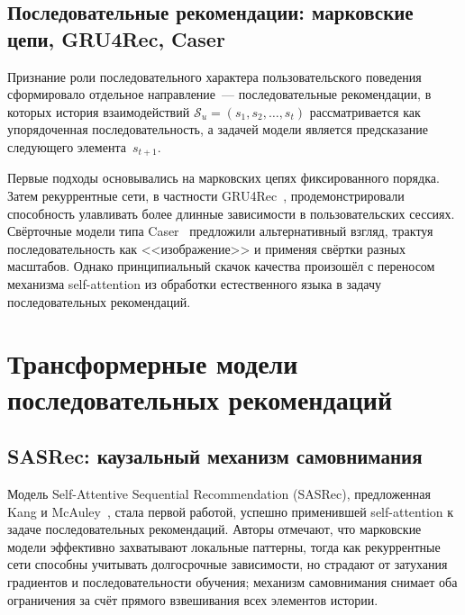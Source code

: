 \subsection{Последовательные рекомендации: марковские цепи, GRU4Rec, Caser}
\label{subsec:ch1:seq-pre-transformer}

Признание роли последовательного характера пользовательского поведения сформировало отдельное направление~--- последовательные рекомендации, в которых история взаимодействий $\mathcal{S}_u = (s_1, s_2, \ldots, s_t)$ рассматривается как упорядоченная последовательность, а задачей модели является предсказание следующего элемента~$s_{t+1}$.

Первые подходы основывались на марковских цепях фиксированного порядка. Затем рекуррентные сети, в частности GRU4Rec~\cite{hidasi2016session}, продемонстрировали способность улавливать более длинные зависимости в пользовательских сессиях. Свёрточные модели типа Caser~\cite{tang2018caser} предложили альтернативный взгляд, трактуя последовательность как <<изображение>> и применяя свёртки разных масштабов. Однако принципиальный скачок качества произошёл с переносом механизма self-attention из обработки естественного языка в задачу последовательных рекомендаций.

\section{Трансформерные модели последовательных рекомендаций}
\label{sec:ch1:transformers}

\subsection{SASRec: каузальный механизм самовнимания}
\label{subsec:ch1:sasrec}

Модель Self-Attentive Sequential Recommendation (SASRec), предложенная Kang и McAuley~\cite{sasrec2018}, стала первой работой, успешно применившей self-attention к задаче последовательных рекомендаций. Авторы отмечают, что марковские модели эффективно захватывают локальные паттерны, тогда как рекуррентные сети способны учитывать долгосрочные зависимости, но страдают от затухания градиентов и последовательности обучения; механизм самовнимания снимает оба ограничения за счёт прямого взвешивания всех элементов истории.

